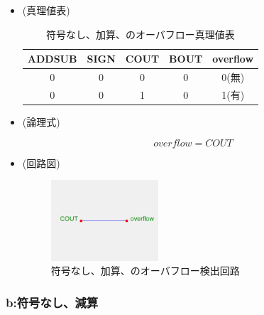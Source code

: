 \documentclass[11pt,a4j]{jsarticle}
\begin{document}
    \begin{itemize}
    \item (真理値表)
    
    \begin{table}[htb]
  \begin{center}
    \caption{符号なし、加算、のオーバフロー真理値表}
    \begin{tabular}{cccc|c} \toprule
ADDSUB & SIGN & COUT & BOUT & overflow \\ \midrule
0 & 0 & 0 & 0 & 0(無) \\
0 & 0 & 1 & 0 & 1(有) \\ \bottomrule
    \end{tabular}
    \label{}
  \end{center}
 \end{table}
    
    \item (論理式)
    
    \begin{equation}
    overflow = COUT
    \end{equation}
    
    \item (回路図)
    
    \begin{figure}[htbp]
  \centering
  \includegraphics[width=4cm,clip]{3-a.png}
  \caption{符号なし、加算、のオーバフロー検出回路}
  \label{fig:3-a}
 \end{figure}
    
    
    \end{itemize}
    
    
    
    \subsubsection{b:符号なし、減算}
    
\end{document}
